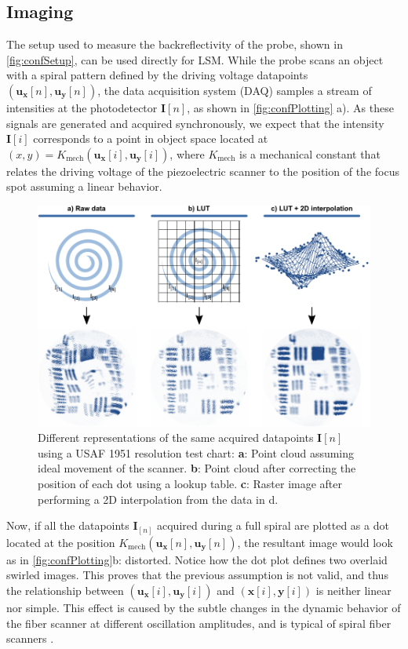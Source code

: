 \subsection{Imaging}
The setup used to measure the backreflectivity of the probe, shown in \autoref{fig:confSetup}, can be used directly for LSM. While the probe scans an object with a spiral pattern defined by the driving voltage datapoints $(\mathbf{u_x}[n], \mathbf{u_y}[n])$, the data acquisition system (DAQ) samples a stream of intensities at the photodetector $\mathbf{I}[n]$, as shown in \autoref{fig:confPlotting} a). As these signals are generated and acquired synchronously, we expect that the intensity $\mathbf{I}[i]$ corresponds to a point in object space located at 
$(x, y) = K_\mathrm{mech}(\mathbf{u_x}[i], \mathbf{u_y}[i])$, where $K_\mathrm{mech}$ is a mechanical constant that relates the driving voltage of the piezoelectric scanner to the position of the focus spot assuming a linear behavior. 

\begin{figure}[h!]\centering \includegraphics{figures/50_Measurements/conf/proc/Plotting.pdf}
      \caption{Different representations of the same acquired datapoints $\mathbf{I}[n]$ using a USAF 1951 resolution test chart: 
      \textbf{a}: Point cloud assuming ideal movement of the scanner.
      \textbf{b}: Point cloud after correcting the position of each dot using a lookup table.
      \textbf{c}: Raster image after performing a 2D interpolation from the data in d.}
      \label{fig:confPlotting}
\end{figure}

Now, if all the datapoints $\mathbf{I}_{[n]}$ acquired during a full spiral are plotted as a dot located at the position $K_\mathrm{mech}(\mathbf{u_x}[n], \mathbf{u_y}[n])$, the resultant image would look as in \autoref{fig:confPlotting}b: distorted. Notice how the dot plot defines two overlaid swirled images. This proves that the previous assumption is not valid, and thus the relationship between $(\mathbf{u_x}[i], \mathbf{u_y}[i])$ and $(\mathbf{x}[i], \mathbf{y}[i])$ is neither linear nor simple. This effect is caused by the subtle changes in the dynamic behavior of the fiber scanner at different oscillation amplitudes, and is typical of spiral fiber scanners \cite{Seibel2006}.

